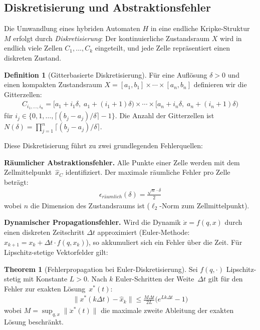 ﻿\documentclass[a4paper,12pt]{article}
\theoremstyle{definition}
\newtheorem{definition}{Definition}[section]
\newtheorem{theorem}{Theorem}[section]
\begin{document}
\subsection{Diskretisierung und Abstraktionsfehler}

Die Umwandlung eines hybriden Automaten $H$ in eine endliche Kripke-Struktur $M$ erfolgt durch \emph{Diskretisierung}: Der kontinuierliche Zustandsraum $X$ wird in endlich viele Zellen $C_1, \ldots, C_k$ eingeteilt, und jede Zelle repräsentiert einen diskreten Zustand.

\begin{definition}[Gitterbasierte Diskretisierung]
Für eine Auflösung $\delta > 0$ und einen kompakten Zustandsraum $X = [a_1, b_1] \times \cdots \times [a_n, b_n]$ definieren wir die Gitterzellen:
\begin{align}
  C_{i_1, \ldots, i_n} = \bigl[a_1 + i_1 \delta,\; a_1 + (i_1+1)\delta\bigr) \times \cdots \times \bigl[a_n + i_n \delta,\; a_n + (i_n+1)\delta\bigr)
\end{align}
für $i_j \in \{0, 1, \ldots, \lceil(b_j - a_j)/\delta\rceil - 1\}$. Die Anzahl der Gitterzellen ist $N(\delta) = \prod_{j=1}^n \lceil(b_j - a_j)/\delta\rceil$.
\end{definition}

Diese Diskretisierung führt zu zwei grundlegenden Fehlerquellen:

\textbf{Räumlicher Abstraktionsfehler.} Alle Punkte einer Zelle werden mit dem Zellmittelpunkt~$\hat{x}_{C}$ identifiziert. Der maximale räumliche Fehler pro Zelle beträgt:
\begin{align}
  \epsilon_{\mathit{räumlich}}(\delta) = \frac{\sqrt{n} \cdot \delta}{2}
\end{align}
wobei $n$ die Dimension des Zustandsraums ist ($\ell_2$-Norm zum Zellmittelpunkt).

\textbf{Dynamischer Propagationsfehler.} Wird die Dynamik $\dot{x} = f(q, x)$ durch einen diskreten Zeitschritt $\Delta t$ approximiert (Euler-Methode: $x_{k+1} = x_k + \Delta t \cdot f(q, x_k)$), so akkumuliert sich ein Fehler über die Zeit. Für Lipschitz-stetige Vektorfelder gilt:

\begin{theorem}[Fehlerpropagation bei Euler-Diskretisierung]
Sei $f(q,\cdot)$ Lipschitz-stetig mit Konstante $L>0$. Nach $k$ Euler-Schritten der Weite~$\Delta t$ gilt für den Fehler zur exakten Lösung~$x^*(t)$:
\begin{align}
  \|x^*(k\Delta t) - \hat{x}_k\| \leq \frac{M \Delta t}{2L} \bigl(e^{Lk\Delta t} - 1\bigr)
\end{align}
wobei $M = \sup_{q,x} \|\ddot{x}^*(t)\|$ die maximale zweite Ableitung der exakten Lösung beschränkt.
\end{theorem}
\end{document}
